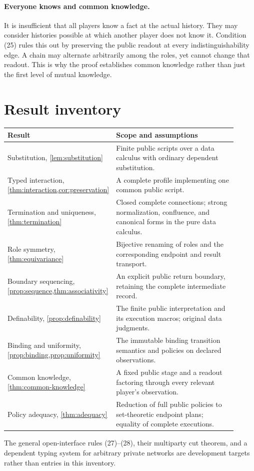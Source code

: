 \paragraph{Everyone knows and common knowledge.}
It is insufficient that all players know a fact at the actual history. They
may consider histories possible at which another player does not know it.
Condition (25) rules this out by preserving the public readout at every
indistinguishability edge. A chain may alternate arbitrarily among the roles,
yet cannot change that readout. This is why the proof establishes common
knowledge rather than just the first level of mutual knowledge.

\section{Result inventory}

\begin{center}
\small
\begin{tabular}{>{\raggedright\arraybackslash}p{0.35\linewidth}>{\raggedright\arraybackslash}p{0.56\linewidth}}
\toprule
Result & Scope and assumptions\\
\midrule
Substitution, \cref{lem:substitution} & Finite public scripts over a data
calculus with ordinary dependent substitution.\\[3pt]
Typed interaction, \cref{thm:interaction,cor:preservation} & A complete
profile implementing one common public script.\\[3pt]
Termination and uniqueness, \cref{thm:termination} & Closed complete
connections; strong normalization, confluence, and canonical forms in the
pure data calculus.\\[3pt]
Role symmetry, \cref{thm:equivariance} & Bijective renaming of roles and the
corresponding endpoint and result transport.\\[3pt]
Boundary sequencing, \cref{prop:sequence,thm:associativity} & An explicit
public return boundary, retaining the complete intermediate record.\\[3pt]
Definability, \cref{prop:definability} & The finite public interpretation and
its execution macros; original data judgments.\\[3pt]
Binding and uniformity, \cref{prop:binding,prop:uniformity} & The immutable
binding transition semantics and policies on declared observations.\\[3pt]
Common knowledge, \cref{thm:common-knowledge} & A fixed public stage and a
readout factoring through every relevant player's observation.\\[3pt]
Policy adequacy, \cref{thm:adequacy} & Reduction of full public policies to
set-theoretic endpoint plans; equality of complete executions.\\
\bottomrule
\end{tabular}
\end{center}

The general open-interface rules (27)--(28), their multiparty cut theorem,
and a dependent typing system for arbitrary private networks are development
targets rather than entries in this inventory.
